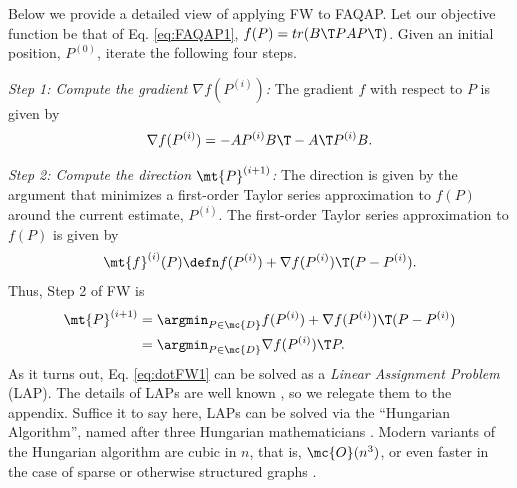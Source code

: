 \documentclass[10pt,journal,cspaper,compsoc]{IEEEtran}
\begin{document}
Below we provide a detailed view of applying FW to FAQAP. Let our objective function be that of Eq. \eqref{eq:FAQAP1}, $f(P)=tr(B\T PAP\T)$. Given an initial position, $P^{(0)}$, iterate the following four steps.

\emph{Step 1: Compute the gradient $\nabla f(P^{(i)})$:}  The gradient $f$ with respect to $P$ is given by
\begin{align} \label{eq:grad}
	\nabla f (P^{(i)}) = 
	  - A P^{(i)} B\T - A\T P^{(i)} B.
\end{align}


\emph{Step 2: Compute the direction $\mt{P}^{(i+1)}$:} The direction is given by the argument that minimizes a first-order Taylor series approximation to $f(P)$ around the current estimate, $P^{(i)}$. The first-order Taylor series approximation to $f(P)$ is given by
\begin{align}
	\mt{f}^{(i)}(P) \defn f(P^{(i)}) + \nabla f(P^{(i)})\T(P - P^{(i)}).
\end{align}
Thus, Step 2 of FW is
\begin{subequations} \label{eq:FW1}
\begin{align}
	\mt{P}^{(i+1)} &= \argmin_{P \in \mc{D}} f(P^{(i)}) + \nabla f(P^{(i)})\T(P - P^{(i)}) 
	\\ &=\argmin_{P \in \mc{D}} \nabla f(P^{(i)})\T P. \label{eq:dotFW1}
\end{align}
\end{subequations}
As it turns out, Eq. \eqref{eq:dotFW1} can be solved as a \emph{Linear Assignment Problem} (LAP).  The details of LAPs are well known \cite{Burkard2009}, so we relegate them to the appendix.  Suffice it to say here, LAPs can be solved via  the ``Hungarian Algorithm'', named after three Hungarian mathematicians \cite{Kuhn1955, Konig1931, Egevary1931}.  Modern variants of the Hungarian algorithm are cubic in $n$, that is, $\mc{O}(n^3)$, or even faster in the case of sparse or otherwise structured graphs \cite{Jonker1987, Burkard2009}.

\end{document}
